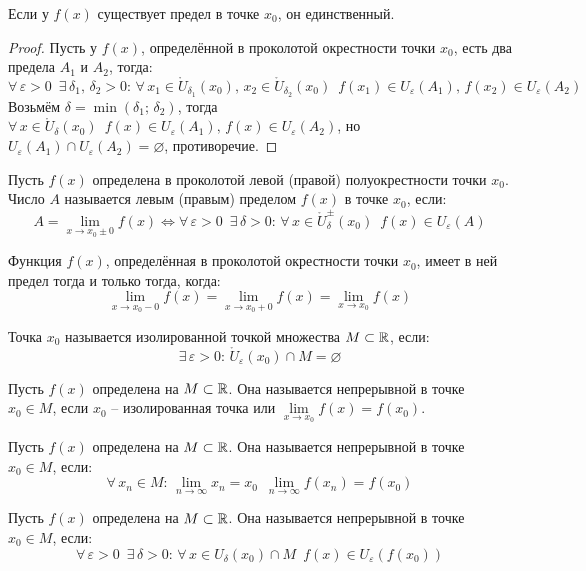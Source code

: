 \documentclass[12pt]{article}
\begin{document}
\begin{theorem}
    Если у $f(x)$ существует предел в точке $x_0$, он единственный.
\end{theorem}
\begin{proof}
    Пусть у $f(x)$, определённой в проколотой окрестности точки $x_0$, есть два предела $A_1$ и $A_2$, тогда:
    $$\forall\,\varepsilon>0\enspace\exists\,\delta_1,\,\delta_2>0:\,\forall\,x_1\in\mathring{U}_{\delta_1}(x_0),\,x_2\in\mathring{U}_{\delta_2}(x_0)\enspace f(x_1)\in U_\varepsilon(A_1),\,f(x_2)\in U_\varepsilon(A_2)$$
    Возьмём $\delta=\min(\delta_1;\,\delta_2)$, тогда $\forall\,x\in\mathring{U}_\delta(x_0)\enspace f(x)\in U_\varepsilon(A_1),\,f(x)\in U_\varepsilon(A_2)$, но $U_\varepsilon(A_1)\cap U_\varepsilon(A_2)=\varnothing$, противоречие.
\end{proof}
\begin{definition}
    Пусть $f(x)$ определена в проколотой левой (правой) полуокрестности точки $x_0$. Число $A$ называется левым (правым) пределом $f(x)$ в точке $x_0$, если:
    $$A=\lim_{x\to x_0\pm0}f(x)\Longleftrightarrow \forall\,\varepsilon>0\enspace\exists\,\delta>0:\,\forall\,x\in\mathring{U}_\delta^\pm(x_0)\enspace f(x)\in U_\varepsilon(A)$$ 
\end{definition}
\begin{statement}
    Функция $f(x)$, определённая в проколотой окрестности точки $x_0$, имеет в ней предел тогда и только тогда, когда:
    $$\lim_{x\to x_0-0}f(x)=\lim_{x\to x_0+0}f(x)=\lim_{x\to x_0}f(x)$$
\end{statement}
\begin{definition}
    Точка $x_0$ называется изолированной точкой множества $M\subset\mathbb{R}$, если:
    $$\exists\,\varepsilon>0:\,\mathring{U}_\varepsilon(x_0)\cap M=\varnothing$$
\end{definition}
\begin{definition}
    Пусть $f(x)$ определена на $M\subset\mathbb{R}$. Она называется непрерывной в точке $x_0\in M$, если $x_0$ -- изолированная точка или $\lim\limits_{x\to x_0}f(x)=f(x_0)$.
\end{definition}
\begin{definition}
    Пусть $f(x)$ определена на $M\subset\mathbb{R}$. Она называется непрерывной в точке $x_0\in M$, если:
    $$\forall\,x_n\in M:\,\lim_{n\to\infty}x_n=x_0\enspace \lim_{n\to\infty}f(x_n)=f(x_0)$$
\end{definition}
\begin{definition}
    Пусть $f(x)$ определена на $M\subset\mathbb{R}$. Она называется непрерывной в точке $x_0\in M$, если:
    $$\forall\,\varepsilon>0\enspace\exists\,\delta>0:\,\forall\,x\in U_\delta(x_0)\cap M\enspace f(x)\in U_\varepsilon(f(x_0))$$
\end{definition}
\end{document}
